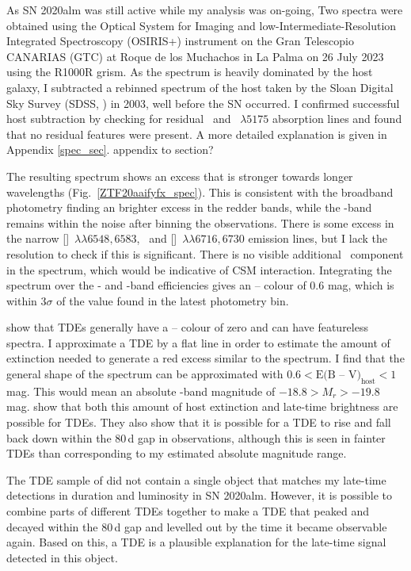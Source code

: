 \documentclass[a4paper,oneside,12pt, class=Latex/Classes/PhDthesisPSnPDF, crop=false]{standalone}
\begin{document}
As SN 2020alm was still active while my analysis was on-going, Two spectra were obtained using the Optical System for Imaging and low-Intermediate-Resolution Integrated Spectroscopy (OSIRIS+) instrument on the Gran Telescopio CANARIAS (GTC) at Roque de los Muchachos in La Palma on 26 July 2023 using the R1000R grism. As the spectrum is heavily dominated by the host galaxy, I subtracted a rebinned spectrum of the host taken by the Sloan Digital Sky Survey (SDSS, \citealt{SDSS-I-II, SDSS_DR4, SDSS_telescope, SDSS_Spectograph}) in 2003, well before the SN occurred. I confirmed successful host subtraction by checking for residual \NaID~and \MgI~${\lambda5175}$ absorption lines and found that no residual features were present. A more detailed explanation is given in Appendix \ref{spec_sec}. \color{red} appendix to section? \color{black}

The resulting spectrum shows an excess that is stronger towards longer wavelengths (Fig.~\ref{ZTF20aaifyfx_spec}). This is consistent with the broadband photometry finding an brighter excess in the redder bands, while the \ztfg-band remains within the noise after binning the observations. There is some excess in the narrow [\NII]~${\lambda\lambda6548,6583}$, \Halpha~and [\SII]~$ {\lambda\lambda6716, 6730}$ emission lines, but I lack the resolution to check if this is significant. There is no visible additional \Halpha~component in the spectrum, which would be indicative of CSM interaction. Integrating the spectrum over the \ztfr- and \ztfi-band efficiencies gives an \ztfr -- \ztfi colour of 0.6 mag, which is within $3\sigma$ of the value found in the latest photometry bin.

\citet{TDE_host_ext_range} show that TDEs generally have a \ztfg -- \ztfr colour of zero and can have featureless spectra. I approximate a TDE by a flat line in order to estimate the amount of extinction needed to generate a red excess similar to the spectrum. I find that the general shape of the spectrum can be approximated with $0.6 < \text{E(B -- V)}_\text{host} < 1$ mag. This would mean an absolute \ztfr-band magnitude of $-18.8 > M_r > -19.8$ mag. \citet{TDE_host_ext_range} show that both this amount of host extinction and late-time brightness are possible for TDEs. They also show that it is possible for a TDE to rise and fall back down within the 80\,d gap in observations, although this is seen in fainter TDEs than corresponding to my estimated absolute magnitude range.

The TDE sample of \citet{TDE_host_ext_range} did not contain a single object that matches my late-time detections in duration and luminosity in SN 2020alm. However, it is possible to combine parts of different TDEs together to make a TDE that peaked and decayed within the 80\,d gap and levelled out by the time it became observable again. Based on this, a TDE is a plausible explanation for the late-time signal detected in this object.\\
\end{document}
